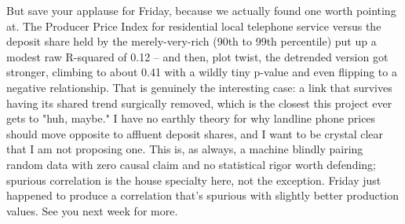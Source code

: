 But save your applause for Friday, because we actually found one worth pointing at. The Producer Price Index for residential local telephone service versus the deposit share held by the merely-very-rich (90th to 99th percentile) put up a modest raw R-squared of 0.12 -- and then, plot twist, the detrended version got stronger, climbing to about 0.41 with a wildly tiny p-value and even flipping to a negative relationship. That is genuinely the interesting case: a link that survives having its shared trend surgically removed, which is the closest this project ever gets to "huh, maybe." I have no earthly theory for why landline phone prices should move opposite to affluent deposit shares, and I want to be crystal clear that I am not proposing one. This is, as always, a machine blindly pairing random data with zero causal claim and no statistical rigor worth defending; spurious correlation is the house specialty here, not the exception. Friday just happened to produce a correlation that's spurious with slightly better production values. See you next week for more.
